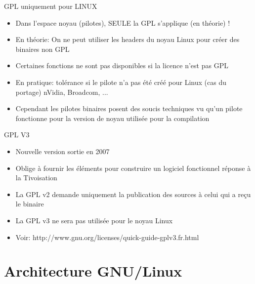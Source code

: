 \begin{frame}{GPL uniquement pour LINUX}{}
  \begin{itemize}
  \item Dans l'espace noyau (pilotes), SEULE la GPL s'applique (en théorie) !
  \item En théorie: On ne peut utiliser les headers du noyau Linux pour créer des binaires non GPL
  \item Certaines fonctions ne sont pas disponibles si la licence n'est pas GPL
  \item En pratique: tolérance si le pilote n'a pas été créé pour Linux (cas du portage) \MVRightarrow{} nVidia, Broadcom, ...
  \item Cependant les pilotes binaires posent des soucis techniques vu qu'un pilote fonctionne pour la version de noyau utilisée pour la compilation
  \end{itemize}
\end{frame}

\begin{frame}{GPL V3}{}
  \begin{itemize}
  \item Nouvelle version sortie en 2007
  \item Oblige à fournir les éléments pour construire un logiciel fonctionnel \MVRightarrow{} réponse à la Tivoisation
  \item La GPL v2 demande uniquement la publication des sources à celui qui a reçu le binaire
  \item La GPL v3 ne sera pas utilisée pour le noyau Linux
  \item Voir: http://www.gnu.org/licenses/quick-guide-gplv3.fr.html
  \end{itemize}
\end{frame}

\section{Architecture GNU/Linux}

